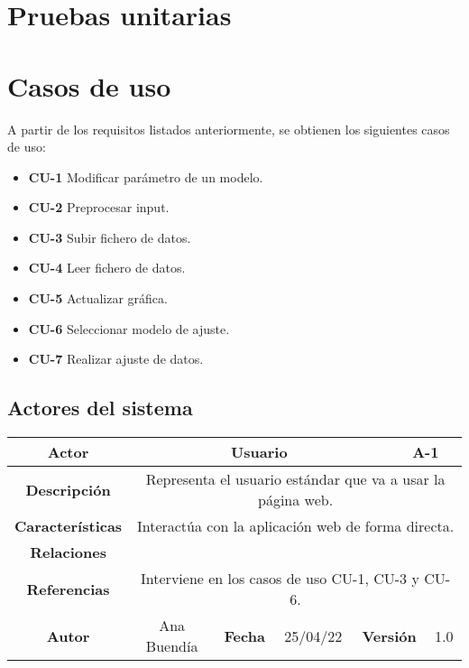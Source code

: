 \section{Pruebas unitarias}



\section{Casos de uso}

A partir de los requisitos listados anteriormente, se obtienen los siguientes casos de uso:

\begin{itemize}
\item \textbf{CU-1} Modificar parámetro de un modelo.
\item \textbf{CU-2} Preprocesar input.
\item \textbf{CU-3} Subir fichero de datos.
\item \textbf{CU-4} Leer fichero de datos.
\item \textbf{CU-5} Actualizar gráfica.
\item \textbf{CU-6} Seleccionar modelo de ajuste.
\item \textbf{CU-7} Realizar ajuste de datos.
\end{itemize}

\subsection{Actores del sistema}

\begin{table}[!h]
\begin{tabular}{|c|c|c|c|c|c|c|c|}
\hline
\textbf{Actor} & \multicolumn{5}{|c|}{Usuario} & \multicolumn{2}{|c|}{A-1} \\
\hline
\textbf{Descripción}              & \multicolumn{7}{|c|}{Representa el usuario estándar que va a usar la página web.}           \\
\hline
\textbf{Características}                 & \multicolumn{7}{|c|}{Interactúa con la aplicación web de forma directa.}             \\
\hline
\textbf{Relaciones}         & \multicolumn{7}{|c|}{}             \\
\hline
\cellcolor{cyan} \textbf{Referencias}        & \multicolumn{7}{|c|}{Interviene en los casos de uso CU-1, CU-3 y CU-6.}              \\
\hline
\cellcolor{cyan} \textbf{Autor}                &   Ana Buendía  & \multicolumn{2}{|c|}{\cellcolor{cyan} \textbf{Fecha}} &  25/04/22   & \multicolumn{2}{|c|}{\cellcolor{cyan} \textbf{Versión}} & 1.0  \\
\hline
\end{tabular}
\end{table}



